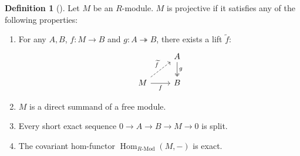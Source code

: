 \documentclass[11pt]{article}
\newcommand{\Hom}{\operatorname{Hom}}
\theoremstyle{plain}
\theoremstyle{definition}
\newtheorem{definition}{Definition}[section]
\begin{document}
  \begin{definition}[\cite{nlab:projective_module}]\label{def-projective}
  Let \(M\) be an \(R\)-module. \(M\) is projective if it satisfies any of the following properties:

  \begin{enumerate}
  \item\label{projective-lifting} For any \(A, B\), \(f : M \to B\) and \(g : A \twoheadrightarrow B\), there exists a lift \(\widetilde{f}\):
    \[
      \begin{tikzcd}
        & A \arrow[two heads]{d}{g}\\
        M \arrow[dashed]{ur}{\widetilde{f}}\arrow[swap]{r}{f}& B
      \end{tikzcd}
    \]
  \item \label{projective-free-summand} \(M\) is a direct summand of a free module.

    \item \label{projective-split} Every short exact sequence \(0 \to A \to B \to M \to 0\) is split.

    \item \label{projective-hom-exact} The covariant hom-functor \(\Hom_{R\text{-Mod}}(M, -)\) is exact.
  \end{enumerate}
\end{definition}
\end{document}
